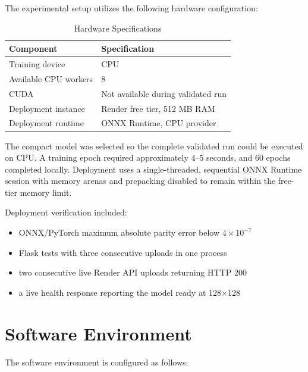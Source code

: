 \documentclass[12pt,a4paper]{report}
\begin{document}
The experimental setup utilizes the following hardware configuration:

\vspace{0.5cm}

\begin{table}[H]
\centering
\caption{Hardware Specifications}
\label{tab:hardware}
\begin{tabular}{|l|l|}
\hline
\textbf{Component} & \textbf{Specification} \\
\hline
Training device & CPU \\
Available CPU workers & 8 \\
CUDA & Not available during validated run \\
Deployment instance & Render free tier, 512 MB RAM \\
Deployment runtime & ONNX Runtime, CPU provider \\
\hline
\end{tabular}
\end{table}

The compact model was selected so the complete validated run could be executed on CPU. A training epoch required approximately 4--5 seconds, and 60 epochs completed locally. Deployment uses a single-threaded, sequential ONNX Runtime session with memory arenas and prepacking disabled to remain within the free-tier memory limit.

\vspace{0.5cm}

Deployment verification included:
\begin{itemize}
    \item ONNX/PyTorch maximum absolute parity error below $4\times10^{-7}$
    \item Flask tests with three consecutive uploads in one process
    \item two consecutive live Render API uploads returning HTTP 200
    \item a live health response reporting the model ready at 128$\times$128
\end{itemize}

\section{Software Environment}

The software environment is configured as follows:

\vspace{0.5cm}
\end{document}
